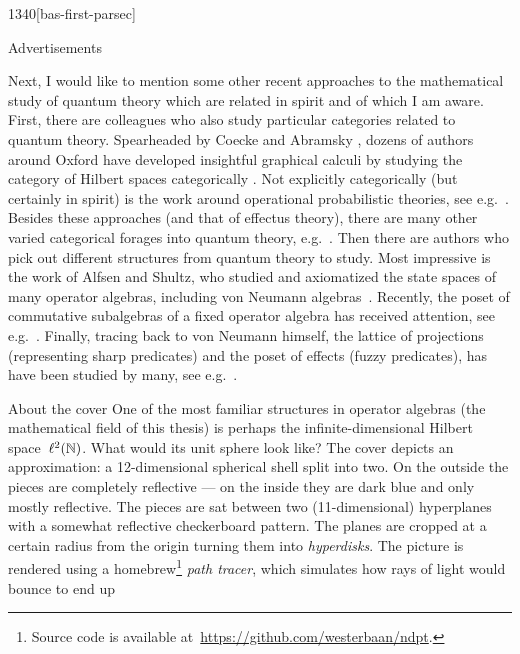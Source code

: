 \begin{parsec}{1340}[bas-first-parsec]
\begin{point}{80}{Advertisements}
\begin{point}{90}%
Next, I would like to mention some other recent approaches
    to the mathematical study of quantum theory
        which are related in spirit and of which I am aware.
First, there are colleagues who also study particular categories
    related to quantum theory.
Spearheaded by Coecke and Abramsky \cite{abramsky2004categorical},
    dozens of authors around Oxford
    have developed insightful graphical calculi
    by studying the category of Hilbert spaces
    categorically \cite{coecke2017picturing}.
Not explicitly categorically (but certainly in spirit)
    is the work around operational probabilistic theories,
    see e.g.~\cite{DAriano2016}.
Besides these approaches (and that of effectus theory),
    there are many other varied categorical forages
    into quantum theory, e.g.~\cite{kornell2012,rennela2017infinite,staton,furber2013kleisli}.
Then there are authors who pick out different structures from quantum theory
    to study.
Most impressive is the work of Alfsen and Shultz,
    who studied and axiomatized the state
    spaces of many operator algebras, including von Neumann algebras~\cite{alfsen2012}.
Recently, the poset of commutative subalgebras of a fixed operator algebra
    has received attention,
    see e.g.~\cite{heunen2015domains,bert,heunen2012bohrification}.
Finally,
    tracing back to von Neumann himself,
    the lattice of projections (representing sharp predicates)
    and the poset of effects (fuzzy predicates),
    has have been studied by many, see e.g.~\cite{dvurecenskij2013new}.
\end{point}
\end{point}
\begin{point}{91}{About the cover}
One of the most familiar structures
    in operator algebras (the mathematical field of this thesis)
    is perhaps the infinite-dimensional
    Hilbert space~$\ell^2(\mathbb{N})$.
What would its unit sphere look like?
The cover depicts an approximation:
    a 12-dimensional spherical shell split into two.
On the outside the pieces are completely reflective ---
    on the inside they are dark blue and only mostly reflective.
The pieces are sat between two (11-dimensional) hyperplanes
    with a somewhat reflective checkerboard pattern.
    The planes are cropped at a certain radius from the origin
        turning them into \emph{hyperdisks}.
The picture is rendered using a homebrew\footnote{%
    Source code is available at~\url{https://github.com/westerbaan/ndpt}.}
    \emph{path tracer},
    which simulates how rays of light would bounce to end up

\end{point}
\end{parsec}
